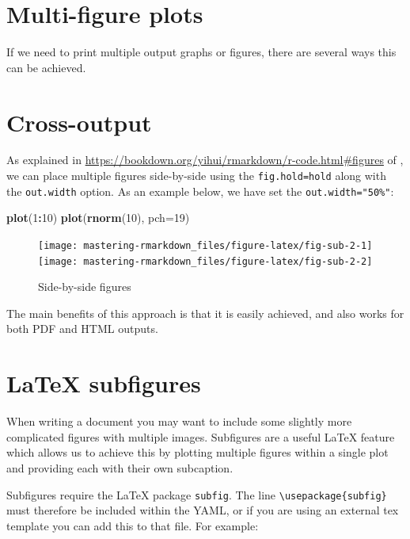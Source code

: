 \documentclass[]{book}
\newenvironment{Shaded}{\begin{snugshade}}{\end{snugshade}}
\newcommand{\KeywordTok}[1]{\textcolor[rgb]{0.13,0.29,0.53}{\textbf{#1}}}
\newcommand{\DataTypeTok}[1]{\textcolor[rgb]{0.13,0.29,0.53}{#1}}
\newcommand{\DecValTok}[1]{\textcolor[rgb]{0.00,0.00,0.81}{#1}}
\newcommand{\OperatorTok}[1]{\textcolor[rgb]{0.81,0.36,0.00}{\textbf{#1}}}
\newcommand{\NormalTok}[1]{#1}
\theoremstyle{definition}
\theoremstyle{definition}
\theoremstyle{definition}
\theoremstyle{remark}
\begin{document}
\section{Multi-figure plots}\label{multi-figure-plots}

If we need to print multiple output graphs or figures, there are several
ways this can be achieved.

\section{Cross-output}\label{cross-output}

As explained in
\url{https://bookdown.org/yihui/rmarkdown/r-code.html\#figures} of
\citet{xie2018}, we can place multiple figures side-by-side using the
\texttt{fig.hold=\textquotesingle{}hold\textquotesingle{}} along with
the \texttt{out.width} option. As an example below, we have set the
\texttt{out.width="50\%"}:

\begin{Shaded}
\begin{Highlighting}[]
\KeywordTok{plot}\NormalTok{(}\DecValTok{1}\OperatorTok{:}\DecValTok{10}\NormalTok{)}
\KeywordTok{plot}\NormalTok{(}\KeywordTok{rnorm}\NormalTok{(}\DecValTok{10}\NormalTok{), }\DataTypeTok{pch=}\DecValTok{19}\NormalTok{)}
\end{Highlighting}
\end{Shaded}

\begin{figure}
\texttt{[image: mastering-rmarkdown\_files/figure-latex/fig-sub-2-1]} \texttt{[image: mastering-rmarkdown\_files/figure-latex/fig-sub-2-2]} \caption{Side-by-side figures}\label{fig:fig-sub-2}
\end{figure}

The main benefits of this approach is that it is easily achieved, and
also works for both PDF and HTML outputs.

\section{LaTeX subfigures}\label{latex-subfigures}

When writing a document you may want to include some slightly more
complicated figures with multiple images. Subfigures are a useful LaTeX
feature which allows us to achieve this by plotting multiple figures
within a single plot and providing each with their own subcaption.

Subfigures require the LaTeX package \texttt{subfig}. The line
\texttt{\textbackslash{}usepackage\{subfig\}} must therefore be included
within the YAML, or if you are using an external tex template you can
add this to that file. For example:
\end{document}
